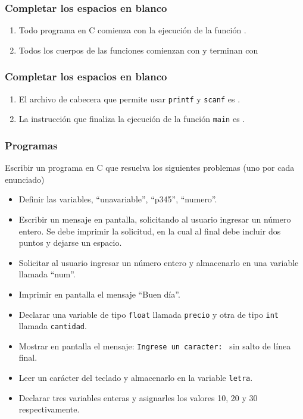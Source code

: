 \begin{ejercicioClase}
    \subsubsection{Completar los espacios en blanco}
    \begin{enumerate}
      \item Todo programa en C comienza con la ejecución de la función \underspace.
      \item Todos los cuerpos de las funciones comienzan con \underspace y terminan con \underspace
    \end{enumerate}

    \subsubsection{Completar los espacios en blanco}
    \begin{enumerate}
      \item El archivo de cabecera que permite usar \texttt{printf} y \texttt{scanf} es \underspace.
      \item La instrucción que finaliza la ejecución de la función \texttt{main} es \underspace.
    \end{enumerate}

    \subsubsection{Programas}
    Escribir un programa en C que resuelva los siguientes problemas (uno por cada enunciado)
    \begin{itemize}
      \item Definir las variables, ``unavariable'', ``p345'', ``numero''.
      \item Escribir un mensaje en pantalla, solicitando al usuario ingresar un número entero. Se debe imprimir la
        solicitud, en la cual al final debe incluir dos puntos y dejarse un espacio.
      \item Solicitar al usuario ingresar un número entero y almacenarlo en una variable llamada ``num''.
      \item Imprimir en pantalla el mensaje ``Buen día''.
      \item Declarar una variable de tipo \texttt{float} llamada \texttt{precio} y otra de tipo \texttt{int} llamada \texttt{cantidad}.
      \item Mostrar en pantalla el mensaje: \texttt{Ingrese un caracter: } sin salto de línea final.
      \item Leer un carácter del teclado y almacenarlo en la variable \texttt{letra}.
      \item Declarar tres variables enteras y asignarles los valores 10, 20 y 30 respectivamente.
    \end{itemize}
    

\end{ejercicioClase}
